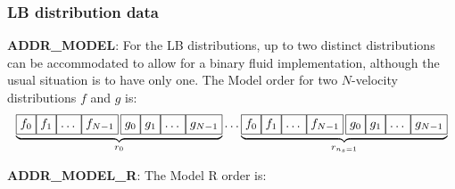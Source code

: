 \subsubsection{LB distribution data}

\textbf{ADDR\_MODEL}: For the LB distributions, up to two distinct
distributions can be accommodated to allow for a binary fluid
implementation, although the usual situation is to have only one.
The Model order for two $N$-velocity distributions $f$ and $g$ is:
\[
\underbrace{
\boxed{f_0\vphantom{f_{N-1}}}    \boxed{f_1\vphantom{f_{N-1}}}
\boxed{\ldots\vphantom{f_{N-1}}} \boxed{f_{N-1}} \,
\boxed{g_0\vphantom{f_{N-1}}}        \boxed{g_1\vphantom{f_{N-1}}}
\boxed{\ldots\vphantom{f_{N-1}}} \boxed{g_{N-1}\vphantom{f_{N-1}}}}_{r_0}
\ldots
\underbrace{
\boxed{f_0\vphantom{f_{N-1}}}    \boxed{f_1\vphantom{f_{N-1}}}
\boxed{\ldots\vphantom{f_{N-1}}} \boxed{f_{N-1}} \,
\boxed{g_0\vphantom{f_{N-1}}}        \boxed{g_1\vphantom{f_{N-1}}}
\boxed{\ldots\vphantom{f_{N-1}}} \boxed{g_{N-1}\vphantom{f_{N-1}}}}_{r_{n_s=1}}
\]

\textbf{ADDR\_MODEL\_R}: The Model R order is:

